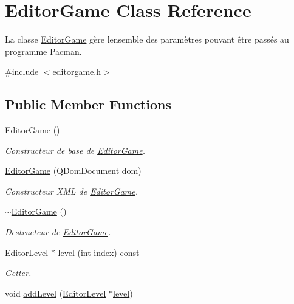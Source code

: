 \hypertarget{class_editor_game}{}\section{Editor\+Game Class Reference}
\label{class_editor_game}


La classe \hyperlink{class_editor_game}{Editor\+Game} gère l\textquotesingle{}ensemble des paramètres pouvant être passés au programme Pacman.  




{\ttfamily \#include $<$editorgame.\+h$>$}

\subsection*{Public Member Functions}
\begin{DoxyCompactItemize}
\item 
\hyperlink{class_editor_game_a81d7f33e9c0f5ce417db16ac121c3ca7}{Editor\+Game} ()
\begin{DoxyCompactList}\small\item\em Constructeur de base de \hyperlink{class_editor_game}{Editor\+Game}. \end{DoxyCompactList}\item 
\hyperlink{class_editor_game_aa39c9fa83c78da05b03477ac172c03e6}{Editor\+Game} (Q\+Dom\+Document dom)
\begin{DoxyCompactList}\small\item\em Constructeur X\+M\+L de \hyperlink{class_editor_game}{Editor\+Game}. \end{DoxyCompactList}\item 
\hyperlink{class_editor_game_a910df7a6be24a5ab77f51ab04bfa2a64}{$\sim$\+Editor\+Game} ()
\begin{DoxyCompactList}\small\item\em Destructeur de \hyperlink{class_editor_game}{Editor\+Game}. \end{DoxyCompactList}\item 
\hyperlink{class_editor_level}{Editor\+Level} $\ast$ \hyperlink{class_editor_game_a071f3a0c8398c26e3d8ffcd8f38f71df}{level} (int index) const 
\begin{DoxyCompactList}\small\item\em Getter. \end{DoxyCompactList}\item 
void \hyperlink{class_editor_game_a08a34b285392ce950141e92e8a3e2490}{add\+Level} (\hyperlink{class_editor_level}{Editor\+Level} $\ast$\hyperlink{class_editor_game_a071f3a0c8398c26e3d8ffcd8f38f71df}{level})

\end{DoxyCompactItemize}
